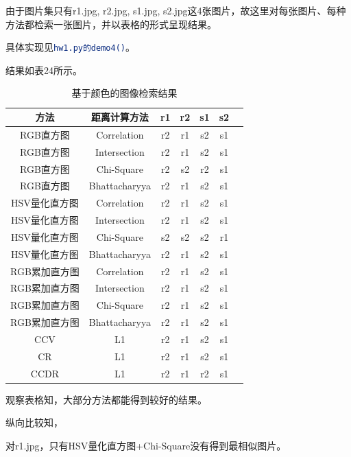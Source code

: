 \documentclass[a4paper, 12pt, UTF8]{article}
\begin{document}
由于图片集只有r1.jpg, r2.jpg, s1.jpg, s2.jpg这4张图片，故这里对每张图片、每种方法都检索一张图片，并以表格的形式呈现结果。

具体实现见\lstinline[language=bash]{hw1.py的demo4()}。

结果如表24所示。

\begin{table}[h!]
    \centering
    \caption{基于颜色的图像检索结果}
    \begin{tabular}{ccccccc}
        方法 & 距离计算方法 & r1 & r2 & s1 & s2 \\ \hline
        RGB直方图     & Correlation   & r2 & r1 & s2 & s1 \\ \hline
        RGB直方图     & Intersection  & r2 & r1 & s2 & s1 \\ \hline
        RGB直方图     & Chi-Square    & r2 & s2 & r2 & s1 \\ \hline
        RGB直方图     & Bhattacharyya & r2 & r1 & s2 & s1 \\ \hline
        HSV量化直方图 & Correlation   & r2 & r1 & s2 & s1 \\ \hline
        HSV量化直方图 & Intersection  & r2 & r1 & s2 & s1 \\ \hline
        HSV量化直方图 & Chi-Square    & s2 & s2 & s2 & r1 \\ \hline
        HSV量化直方图 & Bhattacharyya & r2 & r1 & s2 & s1 \\ \hline
        RGB累加直方图 & Correlation   & r2 & r1 & s2 & s1 \\ \hline
        RGB累加直方图 & Intersection  & r2 & r1 & s2 & s1 \\ \hline
        RGB累加直方图 & Chi-Square    & r2 & r1 & s2 & s1 \\ \hline
        RGB累加直方图 & Bhattacharyya & r2 & r1 & s2 & s1 \\ \hline
        CCV           & L1            & r2 & r1 & s2 & s1 \\ \hline
        CR            & L1            & r2 & r1 & s2 & s1 \\ \hline
        CCDR          & L1            & r2 & r1 & r2 & s1 \\ \hline
    \end{tabular}
\end{table}

观察表格知，大部分方法都能得到较好的结果。

纵向比较知，

对r1.jpg，只有HSV量化直方图+Chi-Square没有得到最相似图片。
\end{document}
